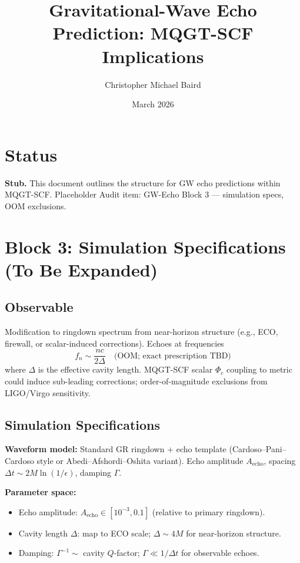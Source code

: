 \documentclass[11pt]{article}
\title{Gravitational-Wave Echo Prediction: MQGT-SCF Implications}
\author{Christopher Michael Baird}
\date{March 2026}
\begin{document}
\maketitle

\section{Status}

\textbf{Stub.} This document outlines the structure for GW echo predictions within MQGT-SCF. Placeholder Audit item: GW-Echo Block 3 — simulation specs, OOM exclusions.

\section{Block 3: Simulation Specifications (To Be Expanded)}

\subsection{Observable}
Modification to ringdown spectrum from near-horizon structure (e.g., ECO, firewall, or scalar-induced corrections). Echoes at frequencies
\begin{equation}
f_n \sim \frac{n c}{2 \Delta} \quad \text{(OOM; exact prescription TBD)}
\end{equation}
where $\Delta$ is the effective cavity length. MQGT-SCF scalar $\Phi_c$ coupling to metric could induce sub-leading corrections; order-of-magnitude exclusions from LIGO/Virgo sensitivity.

\subsection{Simulation Specifications}

\textbf{Waveform model:} Standard GR ringdown + echo template (Cardoso--Pani--Cardoso style or Abedi--Afshordi--Oshita variant). Echo amplitude $A_{\mathrm{echo}}$, spacing $\Delta t \sim 2 M \ln(1/\epsilon)$, damping $\Gamma$.

\textbf{Parameter space:}
\begin{itemize}
\item Echo amplitude: $A_{\mathrm{echo}} \in [10^{-3}, 0.1]$ (relative to primary ringdown).
\item Cavity length $\Delta$: map to ECO scale; $\Delta \sim 4M$ for near-horizon structure.
\item Damping: $\Gamma^{-1} \sim$ cavity $Q$-factor; $\Gamma \ll 1/\Delta t$ for observable echoes.
\end{itemize}
\end{document}
